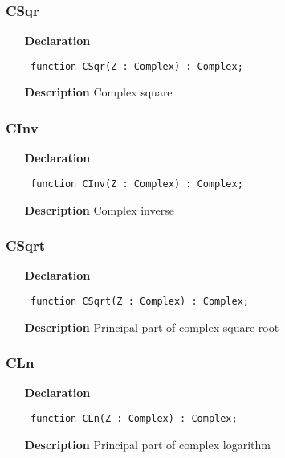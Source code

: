 \documentclass[12pt,a4paper,oneside]{report}
\newcommand{\declarationitem}[1]{\textbf{#1}}
\newcommand{\descriptiontitle}[1]{\textbf{#1}}
\newcommand{\code}[1]{\texttt{#1}}
\begin{document}
\subsubsection{CSqr}
\label{ucomplex-CSqr}
\begin{itemize}\item[\declarationitem{Declaration}\hfill]
\begin{flushleft}
\code{
function CSqr(Z : Complex) : Complex;}

\end{flushleft}

\par
\item[\descriptiontitle{Description}]
Complex square

\end{itemize}
\subsubsection{CInv}
\label{ucomplex-CInv}
\begin{itemize}\item[\declarationitem{Declaration}\hfill]
\begin{flushleft}
\code{
function CInv(Z : Complex) : Complex;}

\end{flushleft}

\par
\item[\descriptiontitle{Description}]
Complex inverse

\end{itemize}
\subsubsection{CSqrt}
\label{ucomplex-CSqrt}
\begin{itemize}\item[\declarationitem{Declaration}\hfill]
\begin{flushleft}
\code{
function CSqrt(Z : Complex) : Complex;}

\end{flushleft}

\par
\item[\descriptiontitle{Description}]
Principal part of complex square root

\end{itemize}
\subsubsection{CLn}
\label{ucomplex-CLn}
\begin{itemize}\item[\declarationitem{Declaration}\hfill]
\begin{flushleft}
\code{
function CLn(Z : Complex) : Complex;}

\end{flushleft}

\par
\item[\descriptiontitle{Description}]
Principal part of complex logarithm

\end{itemize}
\end{document}
